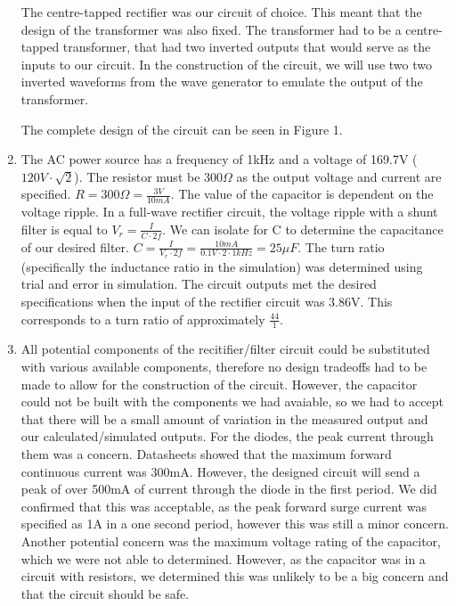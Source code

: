 \documentclass[12pt]{article}
\begin{document}
\begin{enumerate}[label=\alph*.]
    The centre-tapped rectifier was our circuit of choice. This meant that the design of the transformer was also fixed. The transformer had to be a centre-tapped transformer, that had two inverted outputs that would serve as the inputs to our circuit. In the construction of the circuit, we will use two two inverted waveforms from the wave generator to emulate the output of the transformer.

    The complete design of the circuit can be seen in Figure 1.

    \item %
    The AC power source has a frequency of 1kHz and a voltage of 169.7V ($120V\cdot\sqrt{2}$). The resistor must be 300$\Omega$ as the output voltage and current are specified. $R = 300\Omega = \frac{3V}{10mA}$. The value of the capacitor is dependent on the voltage ripple. In a full-wave rectifier circuit, the voltage ripple with a shunt filter is equal to $V_r = \frac{I}{C\cdot2f}$. We can isolate for C to determine the capacitance of our desired filter. $C = \frac{I}{V_r \cdot 2f} = \frac{10mA}{0.1V \cdot 2 \cdot 1kHz} = 25\mu F$. The turn ratio (specifically the inductance ratio in the simulation) was determined using trial and error in simulation. The circuit outputs met the desired specifications when the input of the rectifier circuit was 3.86V. This corresponds to a turn ratio of approximately $\frac{44}{1}$.

    \item %
    All potential components of the recitifier/filter circuit could be substituted with various available components, therefore no design tradeoffs had to be made to allow for the construction of the circuit. However, the capacitor could not be built with the components we had avaiable, so we had to accept that there will be a small amount of variation in the measured output and our calculated/simulated outputs. For the diodes, the peak current through them was a concern. Datasheets showed that the maximum forward continuous current was 300mA. However, the designed circuit will send a peak of over 500mA of current through the diode in the first period. We did confirmed that this was acceptable, as the peak forward surge current was specified as 1A in a one second period, however this was still a minor concern. Another potential concern was the maximum voltage rating of the capacitor, which we were not able to determined. However, as the capacitor was in a circuit with resistors, we determined this was unlikely to be a big concern and that the circuit should be safe.
\end{enumerate}
\pagebreak
\end{document}
